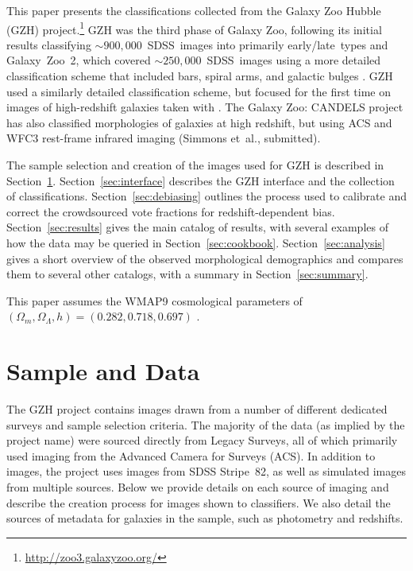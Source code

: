 \documentclass[twocolumn]{aastex6}
\begin{document}
This paper presents the classifications collected from the Galaxy Zoo Hubble
(GZH) project.\footnote{\url{http://zoo3.galaxyzoo.org/}} GZH was the third
phase of Galaxy Zoo, following its initial results classifying
$\sim900,000$~SDSS~images into primarily early/late~types \citep{lin11} and
Galaxy~Zoo~2, which covered $\sim250,000$~SDSS~images using a more detailed
classification scheme that included bars, spiral arms, and galactic bulges
\citep{wil13}. GZH used a similarly detailed classification scheme, but focused
for the first time on images of high-redshift galaxies taken with \hst. The
Galaxy Zoo: CANDELS project has also classified morphologies of galaxies at
high redshift, but using ACS and WFC3 rest-frame infrared imaging (Simmons
et~al., submitted).

The sample selection and creation of the images used for GZH is described in
Section~\ref{sec:data}. Section~\ref{sec:interface} describes the GZH interface
and the collection of classifications. Section~\ref{sec:debiasing} outlines the
process used to calibrate and correct the crowdsourced vote fractions for
redshift-dependent bias. Section~\ref{sec:results} gives the main catalog of
results, with several examples of how the data may be queried in
Section~\ref{sec:cookbook}. Section~\ref{sec:analysis} gives a short overview
of the observed morphological demographics and compares them to several other
catalogs, with a summary in Section~\ref{sec:summary}.

This paper assumes the WMAP9 cosmological parameters of
$(\Omega_m,\Omega_\Lambda,h)=(0.282,0.718,0.697)$ \citep{hin13}.

\section{Sample and Data}\label{sec:data}

The GZH project contains images drawn from a number of different dedicated
surveys and sample selection criteria. The majority of the data (as implied by
the project name) were sourced directly from \hst{} Legacy Surveys, all of which
primarily used imaging from the Advanced Camera for Surveys (ACS). In addition
to \hst{} images, the project uses images from SDSS Stripe~82, as well as
simulated \hst{} images from multiple sources. Below we provide details on each
source of imaging and describe the creation process for images shown to classifiers. 
We also detail the sources of metadata for galaxies in the sample, such as 
photometry and redshifts.
\end{document}

